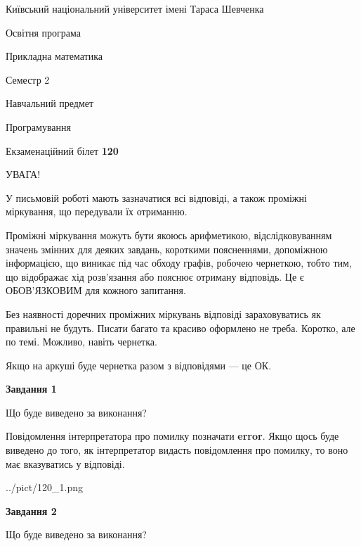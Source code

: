 \documentclass[12pt, ukrainian]{article}
\begin{document}
{{\begin {small}\par
{ \center  Київський національний університет імені Тараса Шевченка \par}
{\parbox {5 cm}{Освітня програма \hfill}{\parbox {7 cm}{Прикладна математика \hfill}}\parbox {6 cm}{\hfill Семестр 2}}\par
{\parbox {5 cm} {Навчальний предмет \hfill}\parbox {7 cm}{Програмування \hfill}\parbox {6cm}{\hfill}\par}\vspace{-7pt} \end{small}}{\center Екзаменаційний білет \No \textbf
{ 120 }\par}}
{
\begin {large}
УВАГА!

У письмовій роботі мають зазначатися всі відповіді, а також проміжні міркування, що передували їх отриманню.

Проміжні міркування можуть бути якоюсь арифметикою, відслідковуванням зна\-чень змінних для деяких завдань,
короткими поясненнями, допоміжною інформацією, що виникає під час обходу графів, робочею чернеткою,
тобто тим, що відображає хід розв’язання або пояснює отриману відповідь.
Це є ОБОВ’ЯЗКОВИМ для кожного запитання.

Без наявності доречних проміжних міркувань відповіді зараховуватись як правиль\-ні не будуть.
Писати багато та красиво оформлено не треба. Коротко, але по темі. Можли\-во, навіть чернетка.

Якщо на аркуші буде чернетка разом з відповідями --- це ОК.

\newpage

{\begin {center}\textbf{Завдання 1}\end {center}}\par
Що буде виведено за виконання?

Повідомлення інтерпретатора про помилку позначати \textbf{error}.
Якщо щось буде виведено до того, як інтерпретатор видасть повідомлення про помилку, 
то воно має вказуватись у відповіді. \par


\begin{center}
	{../pict/120_1.png}
\end{center}
\newpage

{\begin {center}\textbf{Завдання 2}\end {center}}\par
Що буде виведено за виконання?


\end{large}}
\end{document}
